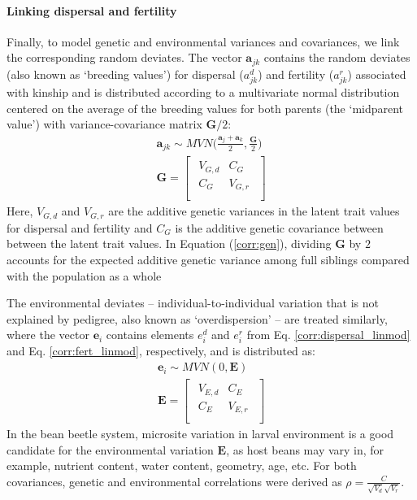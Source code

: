 \documentclass[11pt]{article}
\begin{document}
\paragraph{Linking dispersal and fertility}
Finally, to model genetic and environmental variances and covariances, we link the corresponding random deviates.
The vector $\bm{a}_{jk}$ contains the random deviates (also known as `breeding values') for dispersal ($a^{d}_{jk}$) and fertility ($a^{r}_{jk}$) associated with kinship and is distributed according to a multivariate normal distribution centered on the average of the breeding values for both parents (the `midparent value') with variance-covariance matrix $\bm{G}/2$:
%
\begin{gather} \label{corr:gen}
  \bm{a}_{jk} \sim \mathit{MVN} \Big( \frac{\bm{a}_{j} + \bm{a}_{k}}{2}, \frac{\bm{G}}{2} \Big) \\[10pt]
  \bm{G} =
  \begin{bmatrix}
    \begin{array}{ll}
      V_{G,d} &C_{G}   \\
      C_{G}   &V_{G,r} \\
    \end{array}
  \end{bmatrix}
\end{gather}
%
Here, $V_{G,d}$ and $V_{G,r}$ are the additive genetic variances in the latent trait values for dispersal and fertility and $C_{G}$ is the additive genetic covariance between between the latent trait values.
In Equation (\ref{corr:gen}), dividing $\bm{G}$ by $2$ accounts for the expected additive genetic variance among full siblings compared with the population as a whole \citep{roughgarden_theory_1979}

The environmental deviates -- individual-to-individual variation that is not explained by pedigree, also known as `overdispersion' \citep{de2016general} -- are treated similarly, where the vector $\bm{e}_{i}$ contains elements $e^{d}_{i}$ and $e^{r}_{i}$ from Eq. \ref{corr:dispersal_linmod} and Eq. \ref{corr:fert_linmod}, respectively, and is distributed as:
%
\begin{gather} \label{corr:env}
  \bm{e}_{i} \sim \mathit{MVN} (0, \bm{E}) \\[5pt]
  \bm{E} =
  \begin{bmatrix}
    \begin{array}{ll}
      V_{E,d} &C_{E}   \\
      C_{E}   &V_{E,r} \\
    \end{array}
  \end{bmatrix}
\end{gather}
%
In the bean beetle system, microsite variation in larval environment is a good candidate for the environmental variation $\bm{E}$, as host beans may vary in, for example, nutrient content, water content, geometry, age, etc.
For both covariances, genetic and environmental correlations were derived as $\rho = \frac{C}{\sqrt{V_{d}}\sqrt{V_{r}}}$.
\end{document}
